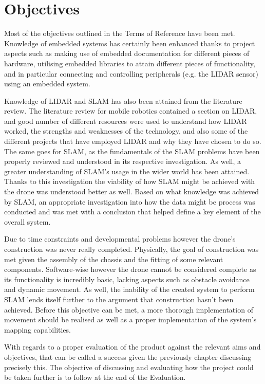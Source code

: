 	
		\section{Objectives}
		Most of the objectives outlined in the Terms of Reference have been met. Knowledge of embedded systems has certainly been enhanced thanks to project aspects such as making use of embedded documentation for different pieces of hardware, utilising embedded libraries to attain different pieces of functionality, and in particular connecting and controlling peripherals (e.g. the LIDAR sensor) using an embedded system. 
		
		Knowledge of LIDAR and SLAM has also been attained from the literature review. The literature review for mobile robotics contained a section on LIDAR, and good number of different resources were used to understand how LIDAR worked, the strengths and weaknesses of the technology, and also some of the different projects that have employed LIDAR and why they have chosen to do so. The same goes for SLAM, as the fundamentals of the SLAM problems have been properly reviewed and understood in its respective investigation. As well, a greater understanding of SLAM's usage in the wider world has been attained. Thanks to this investigation the viability of how SLAM might be achieved with the drone was understood better as well. Based on what knowledge was achieved by SLAM, an appropriate investigation into how the data might be process was conducted and was met with a conclusion that helped define a key element of the overall system.
		
		Due to time constraints and developmental problems however the drone's construction was never really completed. Physically, the goal of construction was met given the assembly of the chassis and the fitting of some relevant components. Software-wise however the drone cannot be considered complete as its functionality is incredibly basic, lacking aspects such as obstacle avoidance and dynamic movement. As well, the inability of the created system to perform SLAM lends itself further to the argument that construction hasn't been achieved. Before this objective can be met, a more thorough implementation of movement should be realised as well as a proper implementation of the system's mapping capabilities. 
		
		With regards to a proper evaluation of the product against the relevant aims and objectives, that can be called a success given the previously chapter discussing precisely this. The objective of discussing and evaluating how the project could be taken further is to follow at the end of the Evaluation.
		
